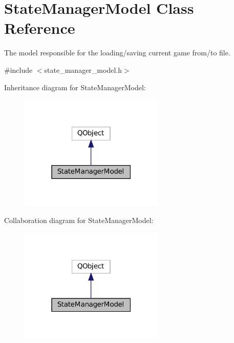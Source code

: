 \hypertarget{class_state_manager_model}{}\section{State\+Manager\+Model Class Reference}
\label{class_state_manager_model}


The model responsible for the loading/saving current game from/to file.  




{\ttfamily \#include $<$state\+\_\+manager\+\_\+model.\+h$>$}



Inheritance diagram for State\+Manager\+Model\+:
\nopagebreak
\begin{figure}[H]
\begin{center}
\leavevmode
\includegraphics[width=195pt]{class_state_manager_model__inherit__graph}
\end{center}
\end{figure}


Collaboration diagram for State\+Manager\+Model\+:
\nopagebreak
\begin{figure}[H]
\begin{center}
\leavevmode
\includegraphics[width=195pt]{class_state_manager_model__coll__graph}
\end{center}
\end{figure}

